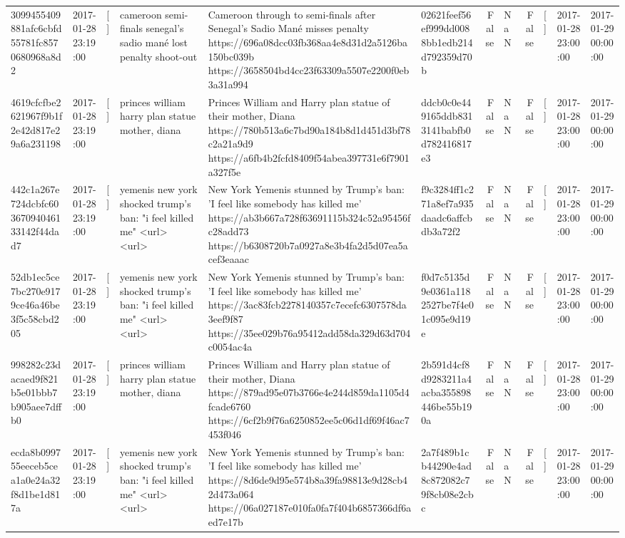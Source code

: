 \begin{tabular}{llllllrlrlll}
3099455409881afc6cbfd55781fc8570680968a8d2 & 2017-01-28 23:19:00 & [] & cameroon semi-finals senegal's sadio mané lost penalty shoot-out & Cameroon through to semi-finals after Senegal’s Sadio Mané misses penalty https://696a08dcc03fb368aa4e8d31d2a5126ba150bc039b https://3658504bd4cc23f63309a5507e2200f0eb3a31a994 & 02621feef56ef999dd0088bb1edb214d792359d70b & False & NaN & False & [] & 2017-01-28 23:00:00 & 2017-01-29 00:00:00 \\
4619cfcfbe2621967f9b1f2e42d817e29a6a231198 & 2017-01-28 23:19:00 & [] & princes william harry plan statue mother, diana & Princes William and Harry plan statue of their mother, Diana https://780b513a6c7bd90a184b8d1d451d3bf78c2a21a9d9 https://a6fb4b2fcfd8409f54abea397731e6f7901a327f5e & ddcb0c0e449165ddb8313141babfb0d782416817e3 & False & NaN & False & [] & 2017-01-28 23:00:00 & 2017-01-29 00:00:00 \\
442c1a267e724dcbfc60367094046133142f44dad7 & 2017-01-28 23:19:00 & [] & yemenis new york shocked trump's ban: "i feel killed me" <url> <url> & New York Yemenis stunned by Trump's ban: 'I feel like somebody has killed me' https://ab3b667a728f63691115b324c52a95456fc28add73 https://b6308720b7a0927a8e3b4fa2d5d07ea5acef3eaaac & f9c3284ff1c271a8ef7a935daadc6affcbdb3a72f2 & False & NaN & False & [] & 2017-01-28 23:00:00 & 2017-01-29 00:00:00 \\
52db1ec5ce7bc270e9179ce46a46be3f5c58cbd205 & 2017-01-28 23:19:00 & [] & yemenis new york shocked trump's ban: "i feel killed me" <url> <url> & New York Yemenis stunned by Trump's ban: 'I feel like somebody has killed me' https://3ac83fcb2278140357c7ecefc6307578da3eef9f87 https://35ee029b76a95412add58da329d63d704c0054ac4a & f0d7c5135d9e0361a1182527be7f4e01c095e9d19e & False & NaN & False & [] & 2017-01-28 23:00:00 & 2017-01-29 00:00:00 \\
998282c23dacaed9f821b5e01bbb7b905aee7dffb0 & 2017-01-28 23:19:00 & [] & princes william harry plan statue mother, diana & Princes William and Harry plan statue of their mother, Diana https://879ad95e07b3766e4e244d859da1105d4fcade6760 https://6cf2b9f76a6250852ee5c06d1df69f46ac7453f046 & 2b591d4cf8d9283211a4acba355898446be55b190a & False & NaN & False & [] & 2017-01-28 23:00:00 & 2017-01-29 00:00:00 \\
ecda8b099755eeceb5cea1a0e24a32f8d1be1d817a & 2017-01-28 23:19:00 & [] & yemenis new york shocked trump's ban: "i feel killed me" <url> <url> & New York Yemenis stunned by Trump's ban: 'I feel like somebody has killed me' https://8d6de9d95e574b8a39fa98813e9d28cb42d473a064 https://06a027187e010fa0fa7f404b6857366df6aed7e17b & 2a7f489b1cb44290e4ad8c872082c79f8cb08e2cbc & False & NaN & False & [] & 2017-01-28 23:00:00 & 2017-01-29 00:00:00 \\

\end{tabular}
